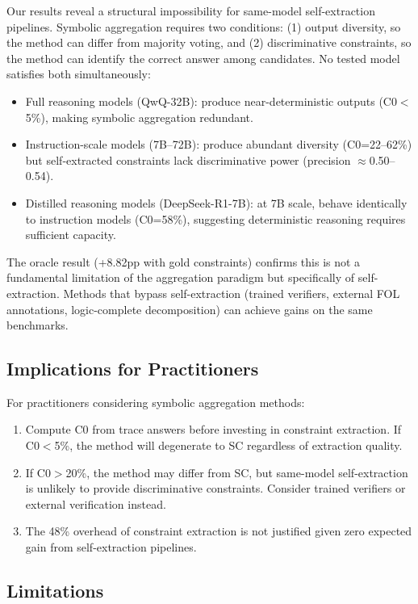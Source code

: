 \documentclass[11pt,a4paper]{article}
\begin{document}
Our results reveal a structural impossibility for same-model self-extraction pipelines. Symbolic aggregation requires two conditions: (1) output diversity, so the method can differ from majority voting, and (2) discriminative constraints, so the method can identify the correct answer among candidates. No tested model satisfies both simultaneously:

\begin{itemize}
\item Full reasoning models (QwQ-32B): produce near-deterministic outputs (C0$<$5\%), making symbolic aggregation redundant.
\item Instruction-scale models (7B--72B): produce abundant diversity (C0=22--62\%) but self-extracted constraints lack discriminative power (precision $\approx$0.50--0.54).
\item Distilled reasoning models (DeepSeek-R1-7B): at 7B scale, behave identically to instruction models (C0=58\%), suggesting deterministic reasoning requires sufficient capacity.
\end{itemize}

The oracle result (+8.82pp with gold constraints) confirms this is not a fundamental limitation of the aggregation paradigm but specifically of self-extraction. Methods that bypass self-extraction (trained verifiers, external FOL annotations, logic-complete decomposition) can achieve gains on the same benchmarks.

\subsection{Implications for Practitioners}

For practitioners considering symbolic aggregation methods:
\begin{enumerate}
\item Compute C0 from trace answers before investing in constraint extraction. If C0$<$5\%, the method will degenerate to SC regardless of extraction quality.
\item If C0$>$20\%, the method may differ from SC, but same-model self-extraction is unlikely to provide discriminative constraints. Consider trained verifiers or external verification instead.
\item The 48\% overhead of constraint extraction is not justified given zero expected gain from self-extraction pipelines.
\end{enumerate}

\subsection{Limitations}
\label{sec:limitations}
\end{document}

